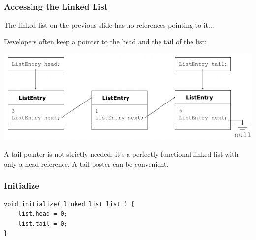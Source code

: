 \begin{frame}
\frametitle{Accessing the Linked List}
The linked list on the previous slide has no references pointing to it...

Developers often keep a pointer to the head and the tail of the list:

\begin{center}
    \includegraphics[width=\textwidth]{images/listheadtail.png}
\end{center}

A tail pointer is not strictly needed; it's a perfectly functional linked list with only a head reference. A tail poster can be convenient.

\end{frame}



\begin{frame}[fragile]
\frametitle{Initialize}

\begin{verbatim}
void initialize( linked_list list ) {
    list.head = 0;
    list.tail = 0;
}
\end{verbatim}

\end{frame}

